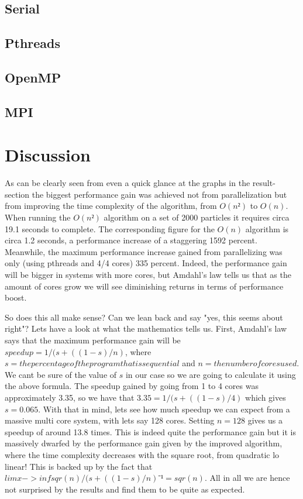 \documentclass[11pt,a4paper]{article}
\begin{document}
\subsection{Serial}
\subsection{Pthreads}
\subsection{OpenMP}
\subsection{MPI}
\section{Discussion}
As can be clearly seen from even a quick glance at the graphs in the result-section the biggest performance gain was achieved not from parallelization but from improving the time complexity of the algorithm, from $O(n²)$ to $O(n)$. When running the $O(n²)$ algorithm on a set of 2000 particles it requires circa 19.1 seconds to complete. The corresponding figure for the $O(n)$ algorithm is circa 1.2 seconds, a performance increase of a staggering 1592 percent. Meanwhile, the maximum performance increase gained from parallelizing was only (using pthreads and 4/4 cores) 335 percent. Indeed, the performance gain will be bigger in systems with more cores, but Amdahl's law tells us that as the amount of cores grow we will see diminishing returns in terms of performance boost.

So does this all make sense? Can we lean back and say "yes, this seems about right"? Lets have a look at what the mathematics tells us. First, Amdahl's law says that the maximum performance gain will be $speedup = 1/(s+((1 - s)/n)$, where $s = the percentage of the program that is sequential$ and $n = the number of cores used$. We cant be sure of the value of $s$ in our case so we are going to calculate it using the above formula. The speedup gained by going from 1 to 4 cores was approximately 3.35, so we have that $3.35 = 1/(s+((1 - s)/4)$ which gives $s = 0.065$. With that in mind, lets see how much speedup we can expect from a massive multi core system, with lets say 128 cores. Setting $n = 128$ gives us a speedup of around 13.8 times. This is indeed quite the performance gain but it is massively dwarfed by the performance gain given by the improved algorithm, where the time complexity decreases with the square root, from quadratic lo linear! This is backed up by the fact that $lim x -> inf sqr(n)/(s+((1 - s)/n)⁻¹ = sqr(n)$. All in all we are hence not surprised by the results and find them to be quite as expected.
\end{document}
